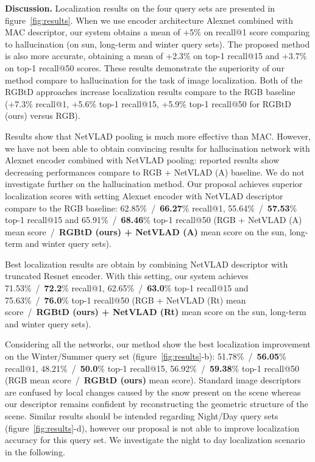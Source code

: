 \vspace{4pt}\noindent\textbf{Discussion.} Localization results on the four query sets are presented in figure~\ref{fig:results}.  When we use encoder architecture Alexnet combined with MAC descriptor, our system obtains a mean of +5\% on recall@1 score comparing to hallucination (on sun, long-term and winter query sets). The proposed method is also more accurate, obtaining a mean of +2.3\% on top-1 recall@15 and +3.7\% on top-1 recall@50 scores. These results demonstrate the superiority of our method compare to hallucination for the task of image localization. Both of the RGBtD approaches increase localization results compare to the RGB baseline (+7.3\% recall@1, +5.6\% top-1 recall@15, +5.9\% top-1 recall@50 for RGBtD (ours) versus RGB).

Results show that NetVLAD pooling is much more effective than MAC. However, we have not been able to obtain convincing results for hallucination network with Alexnet encoder combined with NetVLAD pooling: reported results show decreasing performances compare to RGB + NetVLAD (A) baseline. We do not investigate further on the hallucination method. Our proposal achieves superior localization scores with setting Alexnet encoder with NetVLAD descriptor compare to the RGB baseline: 62.85\%~/~\textbf{66.27}\% recall@1, 55.64\%~/~\textbf{57.53}\% top-1 recall@15 and 65.91\%~/~\textbf{68.46}\% top-1 recall@50  (RGB + NetVLAD (A) mean score~/~\textbf{RGBtD (ours) + NetVLAD (A)} mean score on the sun, long-term and winter query sets).

Best localization results are obtain by combining NetVLAD descriptor with truncated Resnet encoder. With this setting, our system achieves 71.53\%~/~\textbf{72.2}\% recall@1, 62.65\%~/~\textbf{63.0}\% top-1 recall@15 and 75.63\%~/~\textbf{76.0}\% top-1 recall@50  (RGB + NetVLAD (Rt) mean score~/~\textbf{RGBtD (ours) + NetVLAD (Rt)} mean score on the sun, long-term and winter query sets).

Considering all the networks, our method show the best localization improvement on the Winter/Summer query set (figure~\ref{fig:results}-b): 51.78\%~/~\textbf{56.05}\% recall@1, 48.21\%~/~\textbf{50.0}\% top-1 recall@15, 56.92\%~/~\textbf{59.38}\% top-1 recall@50  (RGB mean score~/~\textbf{RGBtD (ours)} mean score). Standard image descriptors are confused by local changes caused by the snow present on the scene whereas our descriptor remains confident by reconstructing the geometric structure of the scene. Similar results should be intended regarding Night/Day query sets (figure~\ref{fig:results}-d), however our proposal is not able to improve localization accuracy for this query set. We investigate the night to day localization scenario in the following.

